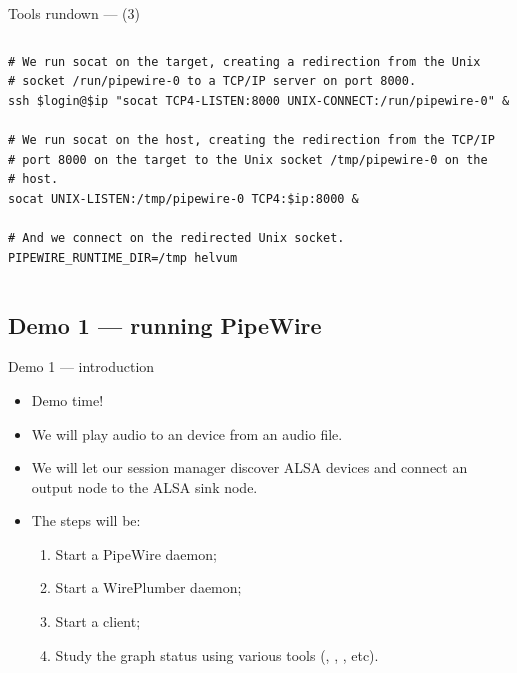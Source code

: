 \begin{frame}[fragile]{Tools rundown —  (3)}
  \begin{columns}

    \begin{block}{}
      \fontsize{9}{9}\selectfont
        \begin{verbatim}
# We run socat on the target, creating a redirection from the Unix
# socket /run/pipewire-0 to a TCP/IP server on port 8000.
ssh $login@$ip "socat TCP4-LISTEN:8000 UNIX-CONNECT:/run/pipewire-0" &

# We run socat on the host, creating the redirection from the TCP/IP
# port 8000 on the target to the Unix socket /tmp/pipewire-0 on the
# host.
socat UNIX-LISTEN:/tmp/pipewire-0 TCP4:$ip:8000 &

# And we connect on the redirected Unix socket.
PIPEWIRE_RUNTIME_DIR=/tmp helvum
        \end{verbatim}
      \end{block}

  \end{columns}
\end{frame}



\subsection{Demo 1 — running PipeWire}



\begin{frame}{Demo 1 — introduction}
  \begin{itemize}

  \item Demo time!

  \item We will play audio to an  device from an audio
    file.

  \item We will let our session manager discover ALSA devices and
    connect an output node to the ALSA sink node.

  \item The steps will be:

    \begin{enumerate}
    \item Start a PipeWire daemon;
    \item Start a WirePlumber daemon;
    \item Start a  client;
    \item Study the graph status using various tools (,
      , , etc).
    \end{enumerate}

  \end{itemize}
\end{frame}



